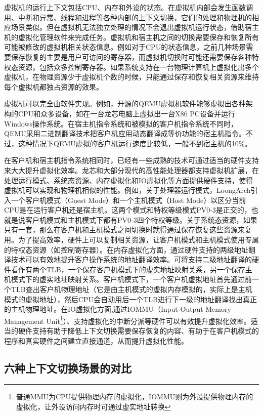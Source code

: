 \documentclass[]{ctexbook}
\begin{document}
虚拟机的运行上下文包括CPU、内存和外设的状态。在虚拟机内部会发生函数调用、中断和异常、线程和进程等各种内部的上下文切换，它们的处理和物理机的相应场景类似。但在虚拟机无法独立处理的情况下会退出虚拟机运行状态，借助宿主机的虚拟化管理软件来完成任务。虚拟机和宿主机之间的切换需要保存和恢复所有可能被修改的虚拟机相关状态信息。例如对于CPU的状态信息，之前几种场景需要保存恢复的主要是用户可访问的寄存器，而虚拟机切换时可能还需要保存各种特权态资源，包括众多控制寄存器。如果系统支持在一台物理计算机上虚拟化出多个虚拟机，在物理资源少于虚拟机个数的时候，只能通过保存和恢复相关资源来维持每个虚拟机都独占资源的效果。

虚拟机可以完全由软件实现。例如，开源的QEMU虚拟机软件能够虚拟出各种架构的CPU和众多设备，如在一台龙芯电脑上虚拟出一台X86 PC设备并运行Windows操作系统。在宿主机指令系统和被模拟的客户机指令系统不同时，QEMU采用二进制翻译技术把客户机应用动态翻译成等价功能的宿主机指令。不过，这种情况下QEMU虚拟的客户机运行速度比较低，一般不到宿主机的10\%。

在客户机和宿主机指令系统相同时，已经有一些成熟的技术可通过适当的硬件支持来大大提升虚拟化效率。龙芯和大部分现代的高性能处理器都支持虚拟机扩展，在处理运行模式、系统态资源、内存虚拟化和IO虚拟化等方面提供硬件支持，使得虚拟机可以实现和物理机相似的性能。例如，关于处理器运行模式，LoongArch引入一个客户机模式（Guest Mode）和一个主机模式（Host Mode）以区分当前CPU是在运行客户机还是宿主机。这两个模式和特权等级模式PV0-3是正交的，也就是说客户机模式和主机模式下都有PV0-3四个特权等级。关于系统态资源，如果只有一套，那么在客户机和主机模式之间切换时就得通过保存恢复这些资源来复用。为了提高效率，硬件上可以复制相关资源，让客户机模式和主机模式使用专属的特权态资源（如控制寄存器）。在内存虚拟化方面，通过硬件支持的两级地址翻译技术可以有效地提升客户操作系统的地址翻译效率。可将支持二级地址翻译的硬件看作有两个TLB，一个保存客户机模式下的虚实地址映射关系，另一个保存主机模式下的虚实地址映射关系。客户机模式下，一个客户机虚拟地址首先通过前一个TLB查出客户机物理地址（它是由主机模式的虚拟内存模拟的，实际上是主机模式的虚拟地址），然后CPU会自动用后一个TLB进行下一级的地址翻译找出真正的主机物理地址。在IO虚拟化方面,通过IOMMU（Input-Output Memory Management Unit\footnote{普通MMU为CPU提供物理内存的虚拟化，IOMMU则为外设提供物理内存的虚拟化，让外设访问内存时可通过虚实地址转换}）、支持虚拟化的中断分派等硬件可以有效提升虚拟化效率。适当的硬件支持有助于降低上下文切换需要保存恢复的内容、有助于在客户机模式的程序和真实硬件之间建立直接通道，从而提升虚拟化性能。

\hypertarget{ux516dux79cdux4e0aux4e0bux6587ux5207ux6362ux573aux666fux7684ux5bf9ux6bd4}{%
\subsection{六种上下文切换场景的对比}\label{ux516dux79cdux4e0aux4e0bux6587ux5207ux6362ux573aux666fux7684ux5bf9ux6bd4}}
\end{document}
